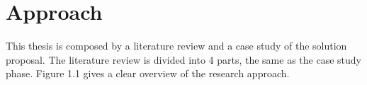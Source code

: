 \section{Approach}
This thesis is composed by a literature review and a case study of the solution proposal. The literature review is divided into 4 parts, the same as the case study phase. Figure 1.1 gives a clear overview of the research approach.

